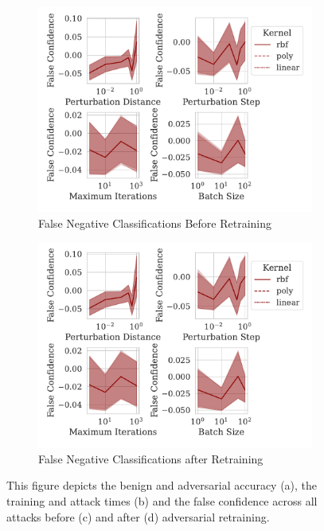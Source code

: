 \documentclass[runningheads]{llncs}
\begin{document}
\begin{figure}
\begin{subfigure}[b]{0.45\textwidth}
         \label{fig:retrain_time}
     \end{subfigure}
     \hfill
     \begin{subfigure}[b]{0.45\textwidth}
         \centering
         \includegraphics[width=\textwidth]{./generated/confidence_vs_attack_parameters.pdf}
         \caption{False Negative Classifications Before Retraining}
        \label{fig:before_retrain}
     \end{subfigure}
     \hfill
     \begin{subfigure}[b]{0.45\textwidth}
         \centering
         \includegraphics[width=\textwidth]{./generated/retrain_confidence_vs_attack_parameters.pdf}
         \caption{False Negative Classifications after Retraining}
        \label{fig:after_retrain}
     \end{subfigure}
     \hfill
     \label{fig:retratin}
     \caption{This figure depicts the benign and adversarial accuracy (a), the training and attack times (b) and the false confidence across all attacks before (c) and after (d) adversarial retraining.}
\end{figure}
\end{document}
